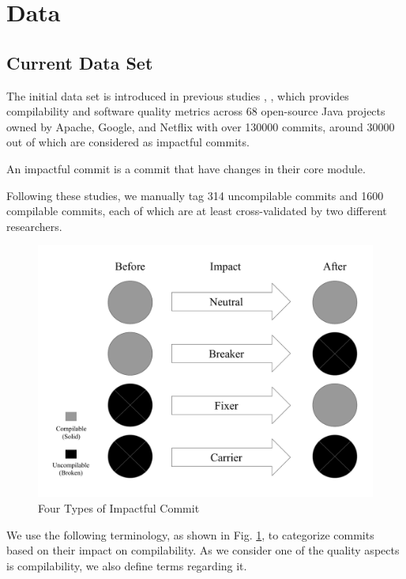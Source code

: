 \section{Data}
\subsection{Current Data Set}
\label{sec:data}

The initial data set is introduced in previous studies \cite{pooyan_esem}, \cite{pooyan_qrs}, which provides compilability and software quality metrics across 68 open-source Java projects owned by Apache, Google, and Netflix with over 130000 commits, around 30000 out of which are considered as impactful commits. 

An impactful commit is a commit that have changes in their core module.

Following these studies, we manually tag 314 uncompilable commits and 1600 compilable commits, each of which are at least cross-validated by two different researchers.

\begin{figure}[htbp]
    \centerline{\includegraphics[scale=0.3]{figures/terminology.pdf}}
    \caption{Four Types of Impactful Commit}
    \label{fig:terminology}
    \end{figure}

We use the following terminology, as shown in Fig. \ref{fig:terminology}, to categorize commits based on their impact on compilability. 
As we consider one of the quality aspects is compilability, we also define terms regarding it.

